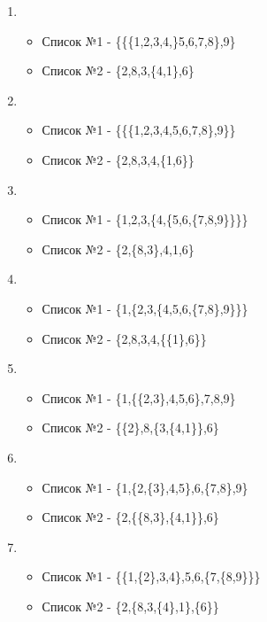\documentclass[a4paper,12pt]{article}
\begin{document}
\begin{enumerate}
	\item \begin{itemize}
		\item Список №1 - \{\{\{1,2,3,4,\}5,6,7,8\},9\}
		\item Список №2 - \{2,8,3,\{4,1\},6\}
	\end{itemize}

	\item \begin{itemize}
		\item Список №1 - \{\{\{1,2,3,4,5,6,7,8\},9\}\}
		\item Список №2 - \{2,8,3,4,\{1,6\}\}
	\end{itemize}

	\item \begin{itemize}
		\item Список №1 - \{1,2,3,\{4,\{5,6,\{7,8,9\}\}\}\}
		\item Список №2 - \{2,\{8,3\},4,1,6\}
	\end{itemize}

	\item \begin{itemize}
		\item Список №1 - \{1,\{2,3,\{4,5,6,\{7,8\},9\}\}\}
		\item Список №2 - \{2,8,3,4,\{\{1\},6\}\}
	\end{itemize}

	\item \begin{itemize}
		\item Список №1 - \{1,\{\{2,3\},4,5,6\},7,8,9\}
		\item Список №2 - \{\{2\},8,\{3,\{4,1\}\},6\}
	\end{itemize}

	\item \begin{itemize}
		\item Список №1 - \{1,\{2,\{3\},4,5\},6,\{7,8\},9\}
		\item Список №2 - \{2,\{\{8,3\},\{4,1\}\},6\}
	\end{itemize}

	\item \begin{itemize}
		\item Список №1 - \{\{1,\{2\},3,4\},5,6,\{7,\{8,9\}\}\}
		\item Список №2 - \{2,\{8,3,\{4\},1\},\{6\}\}
	\end{itemize}


\end{enumerate}
\end{document}
